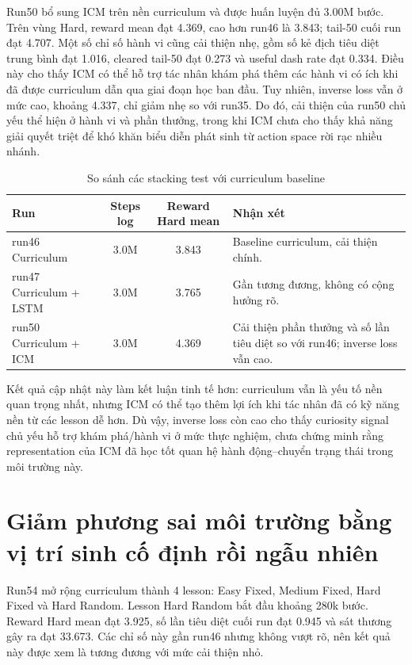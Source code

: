 Run50 bổ sung ICM trên nền curriculum và được huấn luyện đủ 3.00M bước. Trên vùng Hard, reward mean đạt 4.369, cao hơn run46 là 3.843; tail-50 cuối run đạt 4.707. Một số chỉ số hành vi cũng cải thiện nhẹ, gồm số kẻ địch tiêu diệt trung bình đạt 1.016, cleared tail-50 đạt 0.273 và useful dash rate đạt 0.334. Điều này cho thấy ICM có thể hỗ trợ tác nhân khám phá thêm các hành vi có ích khi đã được curriculum dẫn qua giai đoạn học ban đầu. Tuy nhiên, inverse loss vẫn ở mức cao, khoảng 4.337, chỉ giảm nhẹ so với run35. Do đó, cải thiện của run50 chủ yếu thể hiện ở hành vi và phần thưởng, trong khi ICM chưa cho thấy khả năng giải quyết triệt để khó khăn biểu diễn phát sinh từ action space rời rạc nhiều nhánh.

\begin{table}[H]
    \centering
    \small
    \caption{So sánh các stacking test với curriculum baseline}
    \label{tab:stacking_tests}
    \begin{tabular}{|p{4.4cm}|c|c|p{4.8cm}|}
        \hline
        \textbf{Run} & \textbf{Steps log} & \textbf{Reward Hard mean} & \textbf{Nhận xét} \\
        \hline
        run46 Curriculum & 3.0M & 3.843 & Baseline curriculum, cải thiện chính. \\
        \hline
        run47 Curriculum + LSTM & 3.0M & 3.765 & Gần tương đương, không có cộng hưởng rõ. \\
        \hline
        run50 Curriculum + ICM & 3.0M & 4.369 & Cải thiện phần thưởng và số lần tiêu diệt so với run46; inverse loss vẫn cao. \\
        \hline
    \end{tabular}
\end{table}

Kết quả cập nhật này làm kết luận tinh tế hơn: curriculum vẫn là yếu tố nền quan trọng nhất, nhưng ICM có thể tạo thêm lợi ích khi tác nhân đã có kỹ năng nền từ các lesson dễ hơn. Dù vậy, inverse loss còn cao cho thấy curiosity signal chủ yếu hỗ trợ khám phá/hành vi ở mức thực nghiệm, chưa chứng minh rằng representation của ICM đã học tốt quan hệ hành động--chuyển trạng thái trong môi trường này.

\section{Giảm phương sai môi trường bằng vị trí sinh cố định rồi ngẫu nhiên}

Run54 mở rộng curriculum thành 4 lesson: Easy Fixed, Medium Fixed, Hard Fixed và Hard Random. Lesson Hard Random bắt đầu khoảng 280k bước. Reward Hard mean đạt 3.925, số lần tiêu diệt cuối run đạt 0.945 và sát thương gây ra đạt 33.673. Các chỉ số này gần run46 nhưng không vượt rõ, nên kết quả này được xem là tương đương với mức cải thiện nhỏ.

